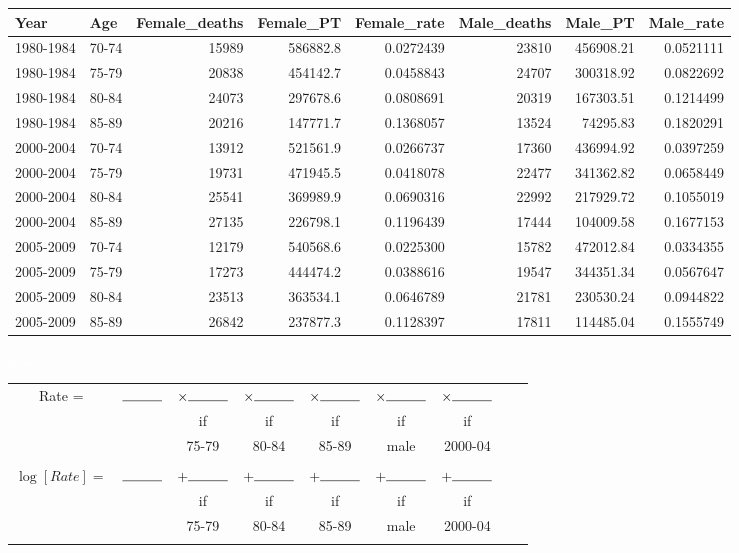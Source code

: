\documentclass[10pt,handout]{beamer}\usepackage[]{graphicx}\usepackage[]{color}
\newenvironment{knitrout}{}{} %
\begin{document}
\begin{frame}
\begin{knitrout}\tiny
{}\color{fgcolor}
\begin{tabular}{l|l|r|r|r|r|r|r}
\hline
Year & Age & Female\_deaths & Female\_PT & Female\_rate & Male\_deaths & Male\_PT & Male\_rate\\
\hline
1980-1984 & 70-74 & 15989 & 586882.8 & 0.0272439 & 23810 & 456908.21 & 0.0521111\\
\hline
1980-1984 & 75-79 & 20838 & 454142.7 & 0.0458843 & 24707 & 300318.92 & 0.0822692\\
\hline
1980-1984 & 80-84 & 24073 & 297678.6 & 0.0808691 & 20319 & 167303.51 & 0.1214499\\
\hline
1980-1984 & 85-89 & 20216 & 147771.7 & 0.1368057 & 13524 & 74295.83 & 0.1820291\\
\hline
2000-2004 & 70-74 & 13912 & 521561.9 & 0.0266737 & 17360 & 436994.92 & 0.0397259\\
\hline
2000-2004 & 75-79 & 19731 & 471945.5 & 0.0418078 & 22477 & 341362.82 & 0.0658449\\
\hline
2000-2004 & 80-84 & 25541 & 369989.9 & 0.0690316 & 22992 & 217929.72 & 0.1055019\\
\hline
2000-2004 & 85-89 & 27135 & 226798.1 & 0.1196439 & 17444 & 104009.58 & 0.1677153\\
\hline
2005-2009 & 70-74 & 12179 & 540568.6 & 0.0225300 & 15782 & 472012.84 & 0.0334355\\
\hline
2005-2009 & 75-79 & 17273 & 444474.2 & 0.0388616 & 19547 & 344351.34 & 0.0567647\\
\hline
2005-2009 & 80-84 & 23513 & 363534.1 & 0.0646789 & 21781 & 230530.24 & 0.0944822\\
\hline
2005-2009 & 85-89 & 26842 & 237877.3 & 0.1128397 & 17811 & 114485.04 & 0.1555749\\
\hline
\end{tabular}

\end{knitrout}

\textcolor{white}{text}\newline

\begin{tabular}{c c c c c c c c c}
	Rate = & $\rule{1cm}{0.15mm}$ & $\times \rule{1cm}{0.15mm}$ & $\times \rule{1cm}{0.15mm}$ & $\times \rule{1cm}{0.15mm}$ & $\times \rule{1cm}{0.15mm}$ & $\times \rule{1cm}{0.15mm}$ \\
	& &   if  &  if &  if & if & if & \\
	& &  75-79 & 80-84 & 85-89 & male & 2000-04 \\  \\
	$\log[Rate] =$ & $\rule{1cm}{0.15mm}$ & $+ \rule{1cm}{0.15mm}$ & $+ \rule{1cm}{0.15mm}$ & $+ \rule{1cm}{0.15mm}$ & $+ \rule{1cm}{0.15mm}$ & $+ \rule{1cm}{0.15mm}$ \\
	& &   if  &  if &  if & if & if & \\
	& &  75-79 & 80-84 & 85-89 & male & 2000-04 \\ \\
	

\end{tabular}
\end{frame}
\end{document}
